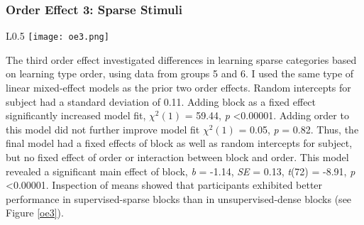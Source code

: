 \documentclass[../dissertation.tex]{subfiles}
\begin{document}
\subsubsection{Order Effect 3: Sparse Stimuli}
\begin{wrapfigure}{L}{0.5\textwidth}
\vspace{-10pt}
\texttt{[image: oe3.png]}
\caption[Accuracy plot for order effect 3]{Accuracy (d') for each block completed by each group for the third order effect.}
\label{oe3}
\vspace{-10pt}
\end{wrapfigure}	
	The third order effect investigated differences in learning sparse categories based on learning type order, using data from groups 5 and 6. I used the same type of linear mixed-effect models as the prior two order effects. Random intercepts for subject had a standard deviation of 0.11. Adding block as a fixed effect significantly increased model fit, $\chi^{2}(1)$ = 59.44,  \textit{p} \textless 0.00001. Adding order to this model  did not further improve model fit $\chi^{2}(1)$ = 0.05,  \textit{p} = 0.82. Thus, the final model had a fixed effects of block as well as random intercepts for subject, but no fixed effect of order or interaction between block and order. This model revealed a significant main effect of block, \textit{b} = -1.14, \textit{SE} = 0.13, \textit{t}(72) = -8.91, \textit{p} \textless  0.00001. Inspection of means showed that participants exhibited better performance in supervised-sparse blocks than in unsupervised-dense blocks (see Figure \ref{oe3}).
	
\end{document}

